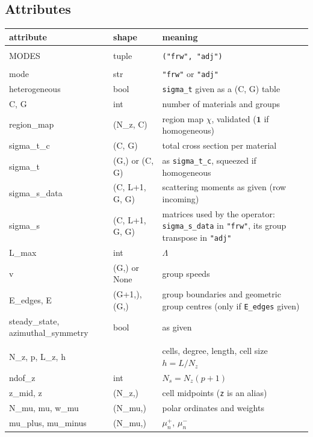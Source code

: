\documentclass[11pt,a4paper]{article}
\newcommand{\Lmax}{\Lambda}
\newcommand{\code}[1]{\texttt{#1}}
\begin{document}
\subsection{Attributes}

\begin{longtable}{@{}>{\ttfamily}p{3.6cm}p{2.9cm}p{9.0cm}@{}}
\toprule
\normalfont attribute & shape & meaning \\
\midrule
\endhead
\multicolumn{3}{@{}l}{\emph{class constant}}\\
MODES & tuple & \code{("frw", "adj")} \\
\multicolumn{3}{@{}l}{\emph{problem data}}\\
mode & str & \code{"frw"} or \code{"adj"} \\
heterogeneous & bool & \code{sigma\_t} given as a (C, G) table \\
C, G & int & number of materials and groups \\
region\_map & (N\_z, C) & region map $\chi$, validated ($\bm 1$ if homogeneous) \\
sigma\_t\_c & (C, G) & total cross section per material \\
sigma\_t & (G,) or (C, G) & as \code{sigma\_t\_c}, squeezed if homogeneous \\
sigma\_s\_data & (C, L+1, G, G) & scattering moments as given (row incoming) \\
sigma\_s & (C, L+1, G, G) & matrices used by the operator: \code{sigma\_s\_data} in \code{"frw"}, its group transpose in \code{"adj"} \\
L\_max & int & $\Lmax$ \\
v & (G,) or None & group speeds \\
E\_edges, E & (G+1,), (G,) & group boundaries and geometric group centres (only if \code{E\_edges} given) \\
steady\_state, \newline azimuthal\_symmetry & bool & as given \\
\multicolumn{3}{@{}l}{\emph{grids}}\\
N\_z, p, L\_z, h & & cells, degree, length, cell size $h=L/N_z$ \\
ndof\_z & int & $N_s=N_z(p+1)$ \\
z\_mid, z & (N\_z,) & cell midpoints (\code{z} is an alias) \\
N\_mu, mu, w\_mu & (N\_mu,) & polar ordinates and weights \\
mu\_plus, mu\_minus & (N\_mu,) & $\mu^+_n$, $\mu^-_n$ \\

\end{longtable}
\end{document}
